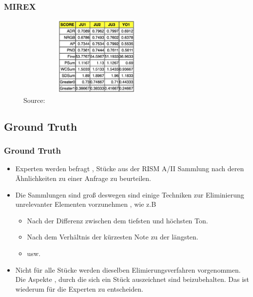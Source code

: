 \documentclass{beamer}
\begin{document}
	\begin{frame}
		\frametitle{MIREX}
		\begin{figure}[h!]
			\includegraphics[width=300px,height=150px,keepaspectratio]{MIREX_2014_results}
			\caption{Source: \cite{mirex_website_2014_results}}
		\end{figure}
	\end{frame}


	\subsection{Ground Truth}
		
		\begin{frame}
			\frametitle{Ground Truth}
			\begin{itemize}
				\item Experten werden befragt , Stücke aus der RISM A/II Sammlung  nach deren Ähnlichkeiten zu einer Anfrage zu beurteilen.
				\item Die Sammlungen sind groß deswegen sind einige Techniken zur Eliminierung unrelevanter Elementen vorzunehmen , wie z.B
					\begin{itemize}
						\item Nach der Differenz zwischen dem tiefsten und höchsten Ton.
						\item Nach dem Verhältnis der kürzesten Note zu der längsten.
						\item usw.
					\end{itemize}
				\item Nicht für alle Stücke werden dieselben Elimierungsverfahren vorgenommen. Die Aspekte , durch die sich ein Stück auszeichnet sind beizubehalten. Das ist wiederum für die Experten zu entscheiden.
			\end{itemize}
		\end{frame}
\end{document}
